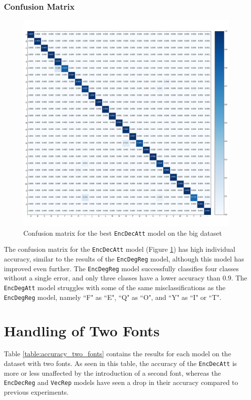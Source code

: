 \newpage
\subsubsection{Confusion Matrix}
\begin{figure}[H]
    \centering
    \includegraphics[width=1\textwidth]{fig/results/experiment1/big/encdecatt/confusion_matrix.png}
    \caption{Confusion matrix for the best {\tt EncDecAtt} model on the big dataset}
    \label{fig:result1_big_encdecatt_confusion_matrix}
\end{figure}

The confusion matrix for the {\tt EncDecAtt} model (Figure \ref{fig:result1_big_encdecatt_confusion_matrix}) has high individual accuracy, similar to the results of the {\tt EncDegReg} model, although this model has improved even further. The {\tt EncDegReg} model successfully classifies four classes without a single error, and only three classes have a lower accuracy than \(0.9\). The {\tt EncDegAtt} model struggles with some of the same misclassifications as the {\tt EncDegReg} model, namely ``F" as ``E", ``Q" as ``O", and ``Y" as ``I" or ``T".


\section{Handling of Two Fonts}
Table \ref{table:accuracy_two_fonts} contains the results for each model on the dataset with two fonts. As seen in this table, the accuracy of the {\tt EncDecAtt} is more or less unaffected by the introduction of a second font, whereas the {\tt EncDecReg} and {\tt VecRep} models have seen a drop in their accuracy compared to previous experiments. 

